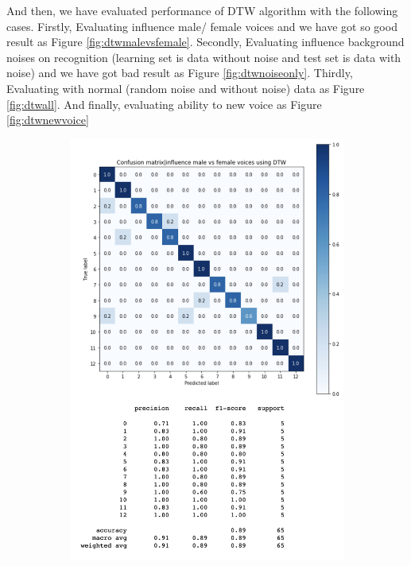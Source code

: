 \documentclass[%
  article,%
  10pt,%
  a4paper,%
  fleqn,%
  oneside,%
  sumario = tradicional,%
  chapter = TITLE,%
  section = TITLE,%
]{abntex2}
\begin{document}
And then, we have evaluated performance of DTW algorithm with the following cases. Firstly, Evaluating influence male/ female voices and we have got so good result as Figure \ref{fig:dtwmalevsfemale}. Secondly, Evaluating influence background noises on recognition (learning set is data without noise and test set is data with noise) and we have got bad result as Figure \ref{fig:dtwnoiseonly}. Thirdly, Evaluating with normal (random noise and without noise) data as Figure \ref{fig:dtwall}. And finally, evaluating ability to new voice as Figure \ref{fig:dtwnewvoice}
\begin{figure}
\centering
\begin{minipage}[b]{.4\textwidth}
\begin{figure}[H]
  \centering
  \includegraphics[width = \columnwidth]{./Figuras/dtwmalefemale}

\end{figure}
\end{minipage}
\end{figure}
\end{document}
